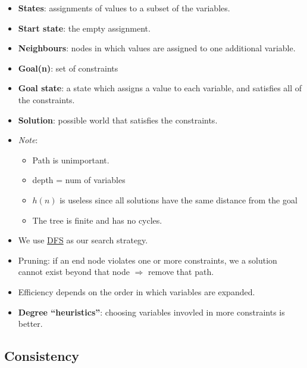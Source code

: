 \documentclass{article}
\begin{document}
\begin{itemize}
    \item \textbf{States}: assignments of values to a subset of the variables.
    \item \textbf{Start state}: the empty assignment.
    \item \textbf{Neighbours}: nodes in which values are assigned to one additional variable.
    \item \textbf{Goal(n)}: set of constraints
    \item \textbf{Goal state}: a state which assigns a value to each variable, and satisfies all of the constraints.
    \item \textbf{Solution}: possible world that satisfies the constraints.
    \item \textit{Note}: 
        \begin{itemize}
            \item Path is unimportant.
            \item depth = num of variables
            \item $h(n)$ is useless since all solutions have the same distance from the goal
            \item The tree is finite and has no cycles.
        \end{itemize}
    \item We use \underline{DFS} as our search strategy.
    \item Pruning: if an end node violates one or more constraints, we a solution cannot exist beyond that node $\Rightarrow$ remove that path.
    \item Efficiency depends on the order in which variables are expanded.
    \item \textbf{Degree ``heuristics''}: choosing variables invovled in more constraints is better.
\end{itemize}

\subsection{Consistency}
\end{document}
